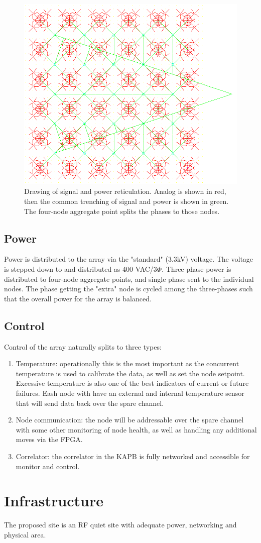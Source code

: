 \documentclass[11pt]{article}
\begin{document}
\begin{figure}[H]
\centering
\includegraphics[width=14cm]{plots/heraconfig576ret.png}
\caption{Drawing of signal and power reticulation.  Analog is shown in red, then the common trenching of signal and power is shown in green.  The four-node aggregate point splits the phases to those nodes.}
\label{fig:heraconfig576ret}
\end{figure}

\subsection{Power}
Power is distributed to the array via the "standard" (3.3kV) voltage.   The voltage is stepped down to and distributed as 400 VAC/3$\Phi$.  Three-phase power is distributed to four-node aggregate points, and single phase sent to the individual nodes.  The phase getting the "extra" node is cycled among the three-phases such that the overall power for the array is balanced.

\subsection{Control}
Control of the array naturally splits to three types:
\begin{enumerate}
\item Temperature:  operationally this is the most important as the concurrent temperature is used to calibrate the data, as well as set the node setpoint.  Excessive temperature is also one of the best indicators of current or future failures.  Eash node with have an external and internal temperature sensor that will send data back over the spare channel.
\item Node communication:  the node will be addressable over the spare channel with some other monitoring of node health, as well as handling any additional moves via the FPGA.
\item Correlator:  the correlator in the KAPB is fully networked and accessible for monitor and control.
\end{enumerate}

\section{Infrastructure}
The proposed site is an RF quiet site with adequate power, networking and physical area.



\end{document}
